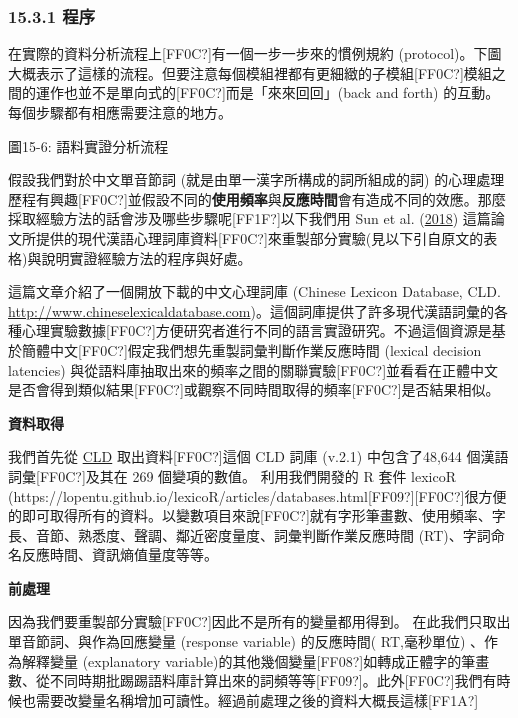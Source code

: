 \subsubsection{15.3.1 程序}

在實際的資料分析流程上[FF0C?]有一個一步一步來的慣例規約 (protocol)。下圖大概表示了這樣的流程。但要注意每個模組裡都有更細緻的子模組[FF0C?]模組之間的運作也並不是單向式的[FF0C?]而是「來來回回」(back and forth) 的互動。每個步驟都有相應需要注意的地方。


圖15-6: 語料實證分析流程

假設我們對於中文單音節詞 (就是由單一漢字所構成的詞所組成的詞) 的心理處理歷程有興趣[FF0C?]並假設不同的\textbf{使用頻率}與\textbf{反應時間}會有造成不同的效應。那麼採取經驗方法的話會涉及哪些步驟呢[FF1F?]以下我們用 Sun et al. (\hyperlink{bookmarkid1mrcu09}{2018}) 這篇論文所提供的現代漢語心理詞庫資料[FF0C?]來重製部分實驗(見以下引自原文的表格)與說明實證經驗方法的程序與好處。

  
 

\parencite{SunEtAl2018} 這篇文章介紹了一個開放下載的中文心理詞庫 (Chinese Lexicon Database, CLD.  \url{http://www.chineselexicaldatabase.com})。這個詞庫提供了許多現代漢語詞彙的各種心理實驗數據[FF0C?]方便研究者進行不同的語言實證研究。不過這個資源是基於簡體中文[FF0C?]假定我們想先重製詞彙判斷作業反應時間 (lexical decision latencies) 與從語料庫抽取出來的頻率之間的關聯實驗[FF0C?]並看看在正體中文是否會得到類似結果[FF0C?]或觀察不同時間取得的頻率[FF0C?]是否結果相似。

\textbf{資料取得}

我們首先從 \href{http://www.chineselexicaldatabase.com/}{CLD} 取出資料[FF0C?]這個 CLD 詞庫 (v.2.1) 中包含了48,644 個漢語詞彙[FF0C?]及其在 269 個變項的數值。 利用我們開發的 R 套件 lexicoR (https://lopentu.github.io/lexicoR/articles/databases.html[FF09?][FF0C?]很方便的即可取得所有的資料。以變數項目來說[FF0C?]就有字形筆畫數、使用頻率、字長、音節、熟悉度、聲調、鄰近密度量度、詞彙判斷作業反應時間 (RT)、字詞命名反應時間、資訊熵值量度等等。 

\textbf{前處理}

因為我們要重製部分實驗[FF0C?]因此不是所有的變量都用得到。 在此我們只取出單音節詞、與作為回應變量 (response variable) 的反應時間( RT,毫秒單位) 、作為解釋變量 (explanatory variable)的其他幾個變量[FF08?]如轉成正體字的筆畫數、從不同時期批踢踢語料庫計算出來的詞頻等等[FF09?]。此外[FF0C?]我們有時候也需要改變量名稱增加可讀性。經過前處理之後的資料大概長這樣[FF1A?]


